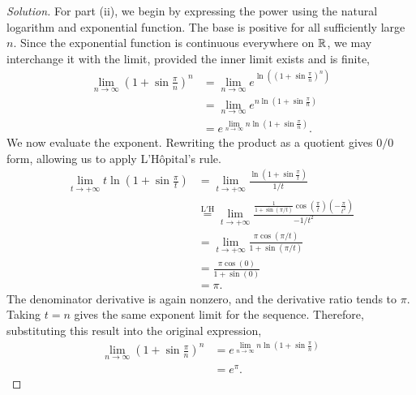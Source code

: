 \begin{proof}[Solution]
  For part (ii), we begin by expressing the power using the natural
  logarithm and exponential function.
  The base is positive for all sufficiently large
  $n$. Since the exponential function is continuous everywhere on
  $\mathbb{R}$, we may interchange it with the limit, provided the inner
  limit exists and is finite,
  \[
    \begin{aligned}
      \lim_{n\to\infty}\left(1+\sin\frac\pi n\right)^n
        &=\lim_{n\to\infty}
          e^{\ln\left((1+\sin\frac\pi n)^n\right)}\\
        &=\lim_{n\to\infty}e^{n\ln(1+\sin\frac\pi n)}\\
        &=e^{\lim_{n\to\infty}n\ln(1+\sin\frac\pi n)}.
    \end{aligned}
  \]
  We now evaluate the exponent. Rewriting the product as a quotient
  gives $0/0$ form, allowing us to apply L'H\^opital's rule.
  \[
    \begin{aligned}
      \lim_{t\to+\infty}t\ln\left(1+\sin\frac\pi t\right)
        &=\lim_{t\to+\infty}
          \frac{\ln(1+\sin\frac\pi t)}{1/t}\\
        &\overset{\mathrm{L'H}}{=}\lim_{t\to+\infty}
          \frac{\frac1{1+\sin(\pi/t)}
            \cos(\frac\pi t)(-\frac\pi{t^2})}{-1/t^2}\\
        &=\lim_{t\to+\infty}
          \frac{\pi\cos(\pi/t)}{1+\sin(\pi/t)}\\
        &=\frac{\pi\cos(0)}{1+\sin(0)}\\
        &=\pi.
    \end{aligned}
  \]
  The denominator derivative is again nonzero,
  and the derivative ratio tends to $\pi$. Taking $t=n$ gives the
  same exponent limit for the sequence.
  Therefore, substituting this result into the original expression,
  \[
    \begin{aligned}
      \lim_{n\to\infty}\left(1+\sin\frac\pi n\right)^n
        &=e^{\lim_{n\to\infty}n\ln(1+\sin\frac\pi n)}\\
        &=e^\pi.
    \end{aligned}
  \]
\end{proof}
